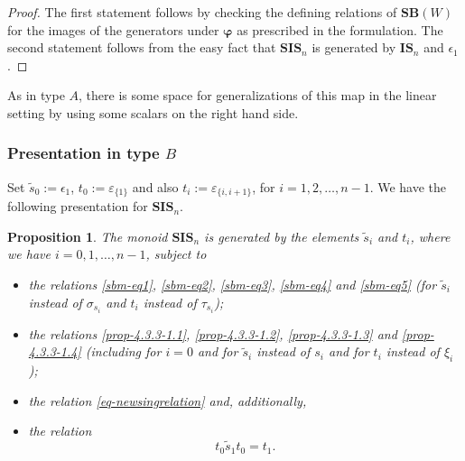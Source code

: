 \documentclass[a4paper]{amsart}
\newtheorem{proposition}[theorem]{Proposition}
\begin{document}
\begin{proof}
The first statement follows by checking the defining relations of $\mathbf{SB}(W)$
for the images of the generators under $\boldsymbol{\varphi}$ 
as prescribed in the formulation. 
The second statement follows from the easy fact that $\mathbf{SIS}_n$
is generated by $\mathbf{IS}_n$ and $\epsilon_1$.
\end{proof}

As in type $A$, there is some space for generalizations of this map in the linear
setting by using some scalars on the right hand side.

\subsubsection{Presentation in type $B$}\label{s4.2.6}

Set $\tilde{s}_0:=\epsilon_1$, $t_0:=\varepsilon_{\{1\}}$
and also $t_i:=\varepsilon_{\{i,i+1\}}$, for $i=1,2,\dots,n-1$.
We have the following presentation for ${\mathbf{SIS}}_n$.

\begin{proposition}\label{prop-4.2.6-1}
The monoid ${\mathbf{SIS}}_n$ is generated by the elements 
$\tilde{s}_i$ and $t_i$, where we have $i=0,1,\dots,n-1$, subject to
\begin{itemize}
\item the relations \eqref{sbm-eq1}, \eqref{sbm-eq2}, 
\eqref{sbm-eq3}, \eqref{sbm-eq4} and \eqref{sbm-eq5}
(for $\tilde{s}_i$  instead of $\sigma_{s_i}$ and $t_i$ instead  of $\tau_{s_i}$);
\item  the relations \eqref{prop-4.3.3-1.1}, \eqref{prop-4.3.3-1.2}, \eqref{prop-4.3.3-1.3}
and \eqref{prop-4.3.3-1.4} (including for $i=0$ and
for $\tilde{s}_i$  instead of $s_i$ and for $t_i$ instead of $\xi_i$); 
\item the relation  \eqref{eq-newsingrelation} and, additionally,
\item the relation
\begin{equation}\label{prop-4.2.6-1.1}
t_0\tilde{s}_1t_0=t_1. 
\end{equation}
\end{itemize}
\end{proposition}
\end{document}
